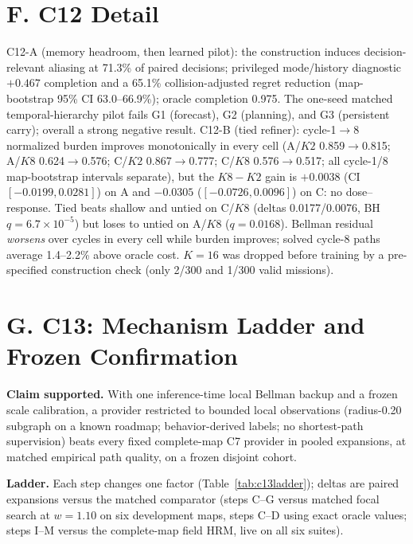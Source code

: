 \documentclass[letterpaper]{article} %
\newcommand{\stage}[1]{\textsc{#1}}
\begin{document}
\section{F. \stage{C12} Detail}

\stage{C12-A} (memory headroom, then learned pilot): the construction induces decision-relevant aliasing at 71.3\% of paired decisions; privileged mode/history diagnostic $+0.467$ completion and a 65.1\% collision-adjusted regret reduction (map-bootstrap 95\% CI 63.0--66.9\%); oracle completion 0.975. The one-seed matched temporal-hierarchy pilot fails G1 (forecast), G2 (planning), and G3 (persistent carry); overall a strong negative result. \stage{C12-B} (tied refiner): cycle-1$\to$8 normalized burden improves monotonically in every cell (A/$K2$ 0.859$\to$0.815; A/$K8$ 0.624$\to$0.576; C/$K2$ 0.867$\to$0.777; C/$K8$ 0.576$\to$0.517; all cycle-1/8 map-bootstrap intervals separate), but the $K8{-}K2$ gain is $+0.0038$ (CI $[-0.0199, 0.0281]$) on A and $-0.0305$ ($[-0.0726, 0.0096]$) on C: no dose--response. Tied beats shallow and untied on C/$K8$ (deltas 0.0177/0.0076, BH $q{=}6.7{\times}10^{-5}$) but loses to untied on A/$K8$ ($q{=}0.0168$). Bellman residual \emph{worsens} over cycles in every cell while burden improves; solved cycle-8 paths average 1.4--2.2\% above oracle cost. $K{=}16$ was dropped before training by a pre-specified construction check (only 2/300 and 1/300 valid missions).

\section{G. C13: Mechanism Ladder and Frozen Confirmation}

\textbf{Claim supported.} With one inference-time local Bellman backup and a frozen scale calibration, a provider restricted to bounded local observations (radius-0.20 subgraph on a known roadmap; behavior-derived labels; no shortest-path supervision) beats every fixed complete-map \stage{C7} provider in pooled expansions, at matched empirical path quality, on a frozen disjoint cohort.

\textbf{Ladder.} Each step changes one factor (Table~\ref{tab:c13ladder}); deltas are paired expansions versus the matched comparator (steps C--G versus matched focal search at $w{=}1.10$ on six development maps, steps C--D using exact oracle values; steps I--M versus the complete-map field HRM, live on all six suites).
\end{document}

